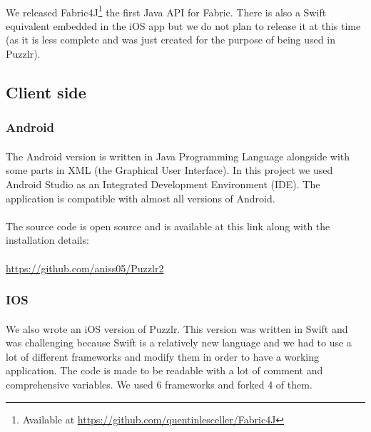  			\paragraph{}
 			We released Fabric4J\footnote{Available at \url{https://github.com/quentinlesceller/Fabric4J}} the first Java API for Fabric. There is also a Swift equivalent embedded in the iOS app but we do not plan to release it at this time (as it is less complete and was just created for the purpose of being used in Puzzlr).
 	\subsection{Client side}
 		\subsubsection{Android}
  			\paragraph{}
			The Android version is written in Java Programming Language alongside with some parts in XML (the Graphical User Interface). In this project we used Android Studio as an Integrated Development Environment (IDE). The application is compatible with almost all versions of Android.
			\paragraph{}
			The source code is open source and is available at this link along with the installation details:
			\paragraph{}
			\color{blue}\underline{https://github.com/aniss05/Puzzlr2}\color{black} 
	  	
	\subsubsection{IOS}
	\paragraph{}
	We also wrote an iOS version of Puzzlr. This version was written in Swift and was challenging because Swift is a relatively new language and we had to use a lot of different frameworks and modify them in order to have a working application. The code is made to be readable with a lot of comment and comprehensive variables.
	We used 6 frameworks and forked 4 of them.

